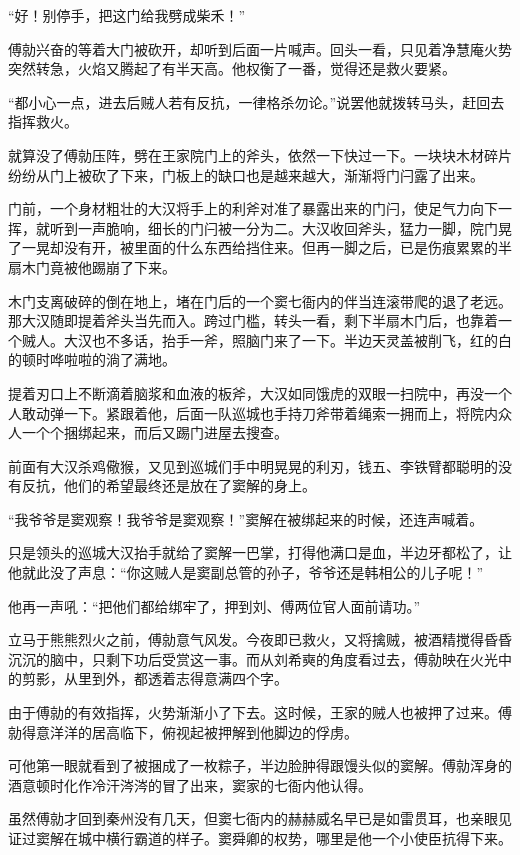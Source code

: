 “好！别停手，把这门给我劈成柴禾！”

傅勍兴奋的等着大门被砍开，却听到后面一片喊声。回头一看，只见着净慧庵火势突然转急，火焰又腾起了有半天高。他权衡了一番，觉得还是救火要紧。

“都小心一点，进去后贼人若有反抗，一律格杀勿论。”说罢他就拨转马头，赶回去指挥救火。

就算没了傅勍压阵，劈在王家院门上的斧头，依然一下快过一下。一块块木材碎片纷纷从门上被砍了下来，门板上的缺口也是越来越大，渐渐将门闩露了出来。

门前，一个身材粗壮的大汉将手上的利斧对准了暴露出来的门闩，使足气力向下一挥，就听到一声脆响，细长的门闩被一分为二。大汉收回斧头，猛力一脚，院门晃了一晃却没有开，被里面的什么东西给挡住来。但再一脚之后，已是伤痕累累的半扇木门竟被他踢崩了下来。

木门支离破碎的倒在地上，堵在门后的一个窦七衙内的伴当连滚带爬的退了老远。那大汉随即提着斧头当先而入。跨过门槛，转头一看，剩下半扇木门后，也靠着一个贼人。大汉也不多话，抬手一斧，照脑门来了一下。半边天灵盖被削飞，红的白的顿时哗啦啦的淌了满地。

提着刃口上不断滴着脑浆和血液的板斧，大汉如同饿虎的双眼一扫院中，再没一个人敢动弹一下。紧跟着他，后面一队巡城也手持刀斧带着绳索一拥而上，将院内众人一个个捆绑起来，而后又踢门进屋去搜查。

前面有大汉杀鸡儆猴，又见到巡城们手中明晃晃的利刃，钱五、李铁臂都聪明的没有反抗，他们的希望最终还是放在了窦解的身上。

“我爷爷是窦观察！我爷爷是窦观察！”窦解在被绑起来的时候，还连声喊着。

只是领头的巡城大汉抬手就给了窦解一巴掌，打得他满口是血，半边牙都松了，让他就此没了声息：“你这贼人是窦副总管的孙子，爷爷还是韩相公的儿子呢！”

他再一声吼：“把他们都给绑牢了，押到刘、傅两位官人面前请功。”

立马于熊熊烈火之前，傅勍意气风发。今夜即已救火，又将擒贼，被酒精搅得昏昏沉沉的脑中，只剩下功后受赏这一事。而从刘希奭的角度看过去，傅勍映在火光中的剪影，从里到外，都透着志得意满四个字。

由于傅勍的有效指挥，火势渐渐小了下去。这时候，王家的贼人也被押了过来。傅勍得意洋洋的居高临下，俯视起被押解到他脚边的俘虏。

可他第一眼就看到了被捆成了一枚粽子，半边脸肿得跟馒头似的窦解。傅勍浑身的酒意顿时化作冷汗涔涔的冒了出来，窦家的七衙内他认得。

虽然傅勍才回到秦州没有几天，但窦七衙内的赫赫威名早已是如雷贯耳，也亲眼见证过窦解在城中横行霸道的样子。窦舜卿的权势，哪里是他一个小使臣抗得下来。

